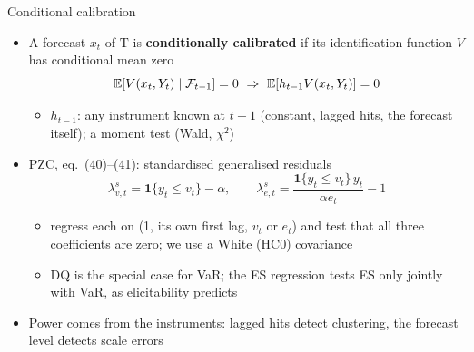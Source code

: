 \begin{frame}{Conditional calibration}
\itemsize{\small}
\begin{itemize}
    \item A forecast $x_t$ of $\mathrm T$ is \textbf{conditionally calibrated} if its identification function $V$ has conditional mean zero 
    \[ \mathbb{E}[V(x_t, Y_t) \mid \mathcal F_{t-1}] = 0 \ \Rightarrow\ \mathbb{E}[h_{t-1}V(x_t, Y_t)] = 0 \]
    \begin{itemize}
        \item $h_{t-1}$: any instrument known at $t-1$ (constant, lagged hits, the forecast itself); a moment test (Wald, $\chi^2$)
    \end{itemize}
    \item PZC, eq.~(40)--(41): standardised generalised residuals
    \[ \lambda^s_{v,t} = \mathbf 1\{y_t \le v_t\} - \alpha, \qquad \lambda^s_{e,t} = \frac{\mathbf 1\{y_t \le v_t\}\,y_t}{\alpha e_t} - 1 \]
    \begin{itemize}
        \item regress each on (1, its own first lag, $v_t$ or $e_t$) and test that all three coefficients are zero; we use a White (HC0) covariance
        \item DQ is the special case for VaR; the ES regression tests ES only jointly with VaR, as elicitability predicts
    \end{itemize}
    \item Power comes from the instruments: lagged hits detect clustering, the forecast level detects scale errors
\end{itemize}
\end{frame}

